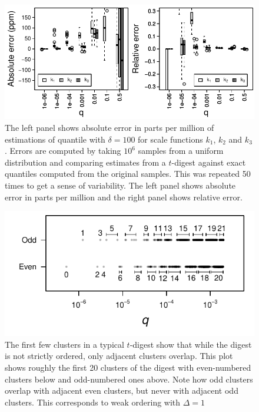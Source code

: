 \documentclass[]{statsoc}
\begin{document}
\begin{figure}[p] %
   \includegraphics[width=5.5in]{relative-error.pdf} 
   \caption{The left panel shows absolute error in parts per million of estimations of quantile with $\delta = 100$ for scale functions $k_1$, $k_2$ and $k_3$. Errors are computed by taking $10^6$ samples from a uniform distribution and comparing estimates from a $t$-digest against exact quantiles computed from the original samples. This was repeated 50 times to get a sense of variability. The left panel shows absolute error in parts per million and the right panel shows relative error.}
   \label{fig:by-scale}
\end{figure}

\begin{figure}[p] %
   \includegraphics[width=4.5in]{cluster-spread.pdf} 
   \caption{The first few clusters in a typical $t$-digest show that while the digest is not strictly ordered, only adjacent clusters overlap. This plot shows roughly the first 20 clusters of the digest with even-numbered clusters below and odd-numbered ones above. Note how odd clusters overlap with adjacent even clusters, but never with adjacent odd clusters. This corresponds to weak ordering with $\Delta=1$  }
   \label{fig:cluster-spread}
\end{figure}
\end{document}

